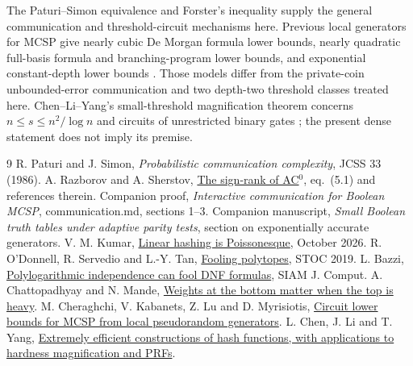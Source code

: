 \documentclass[11pt]{article}
\begin{document}
The Paturi--Simon equivalence and Forster's inequality supply the general communication and threshold-circuit mechanisms here. Previous local generators for MCSP give nearly cubic De Morgan formula lower bounds, nearly quadratic full-basis formula and branching-program lower bounds, and exponential constant-depth lower bounds \cite{cklm}. Those models differ from the private-coin unbounded-error communication and two depth-two threshold classes treated here. Chen--Li--Yang's small-threshold magnification theorem concerns $n\le s\le n^2/\log n$ and circuits of unrestricted binary gates \cite[Theorem 1.6]{cly}; the present dense statement does not imply its premise.

\begin{thebibliography}{9}
 R. Paturi and J. Simon, \emph{Probabilistic communication complexity}, JCSS 33 (1986).
 A. Razborov and A. Sherstov, \href{https://web.cs.ucla.edu/~sherstov/pdf/sign.pdf}{The sign-rank of AC$^0$}, eq.~(5.1) and references therein.
 Companion proof, \emph{Interactive communication for Boolean MCSP}, communication.md, sections 1--3.
 Companion manuscript, \emph{Small Boolean truth tables under adaptive parity tests}, section on exponentially accurate generators.
 V. M. Kumar, \href{https://arxiv.org/abs/2610.34750}{Linear hashing is Poissonesque}, October 2026.
 R. O'Donnell, R. Servedio and L.-Y. Tan, \href{https://www.cs.cmu.edu/~odonnell/papers/fooling-polytopes.pdf}{Fooling polytopes}, STOC 2019.
 L. Bazzi, \href{https://doi.org/10.1137/070691954}{Polylogarithmic independence can fool DNF formulas}, SIAM J. Comput.
 A. Chattopadhyay and N. Mande, \href{https://arxiv.org/abs/1705.02397}{Weights at the bottom matter when the top is heavy}.
 M. Cheraghchi, V. Kabanets, Z. Lu and D. Myrisiotis, \href{https://doi.org/10.4230/LIPIcs.ICALP.2019.39}{Circuit lower bounds for MCSP from local pseudorandom generators}.
 L. Chen, J. Li and T. Yang, \href{https://doi.org/10.4230/LIPIcs.CCC.2022.23}{Extremely efficient constructions of hash functions, with applications to hardness magnification and PRFs}.
\end{thebibliography}
\end{document}
